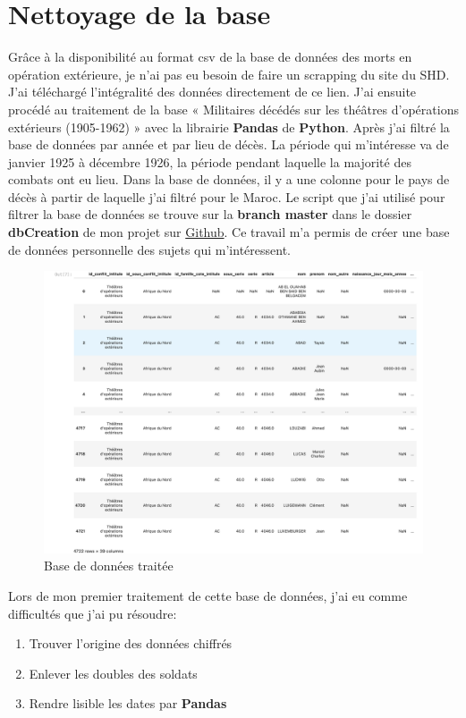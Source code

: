 \section{Nettoyage de la base}
Grâce à la disponibilité au format csv de la base de données des morts en opération extérieure, je n'ai pas eu besoin de faire un scrapping du site du SHD. J'ai téléchargé l’intégralité des données directement de ce lien. J'ai ensuite procédé au traitement de la  base « Militaires décédés sur les théâtres d'opérations extérieurs (1905-1962) » avec la librairie \textbf{Pandas} de \textbf{Python}. Après  j'ai filtré la base de données par année et par lieu de décès. La période qui m'intéresse va de janvier 1925 à décembre 1926, la période pendant laquelle la majorité des combats ont eu lieu. Dans la base de données, il y a une colonne pour le pays de décès à partir de laquelle j'ai filtré pour le Maroc. Le script que j'ai utilisé pour filtrer la base de données se trouve sur la \textbf{branch master} dans le dossier \textbf{dbCreation} de mon projet sur \href{https://github.com/the0phil3/projetMemoire}{Github}. Ce travail m'a permis de créer une base de données personnelle des sujets qui m'intéressent.
\begin{figure}[H]
    \centering
    \includegraphics[scale=0.3]{Images/mortsduRif.png}
    \caption{Base de données traitée}
    \label{fig:Base de données}
\end{figure}
Lors de mon premier traitement de cette base de données, j'ai eu comme difficultés que j'ai pu résoudre: \begin{enumerate}
\item Trouver l'origine des données chiffrés 
\item Enlever les doubles des soldats
\item Rendre lisible les dates par \textbf{Pandas}   
\end{enumerate}

